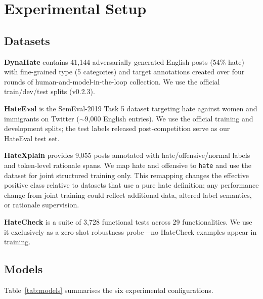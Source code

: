 \documentclass{article}
\begin{document}
\section{Experimental Setup}
\label{sec:experiments}

\subsection{Datasets}

\textbf{DynaHate} \citep{vidgen2021dynahate} contains 41,144 adversarially
generated English posts (54\% hate) with fine-grained type (5 categories) and
target annotations created over four rounds of human-and-model-in-the-loop
collection.
We use the official train/dev/test splits (v0.2.3).

\textbf{HateEval} \citep{basile2019semeval} is the SemEval-2019 Task 5 dataset
targeting hate against women and immigrants on Twitter ($\sim$9,000 English
entries).
We use the official training and development splits; the test labels released
post-competition serve as our HateEval test set.

\textbf{HateXplain} \citep{mathew2021hatexplain} provides 9,055 posts annotated
with hate/offensive/normal labels and token-level rationale spans.
We map hate and offensive to \texttt{hate} and use the dataset for joint
structured training only.
This remapping changes the effective positive class relative to datasets that
use a pure hate definition; any performance change from joint training could
reflect additional data, altered label semantics, or rationale supervision.

\textbf{HateCheck} \citep{rottger2021hatecheck} is a suite of 3,728 functional
tests across 29 functionalities.
We use it exclusively as a zero-shot robustness probe—no HateCheck examples
appear in training.

\subsection{Models}

Table~\ref{tab:models} summarises the six experimental configurations.
\end{document}
